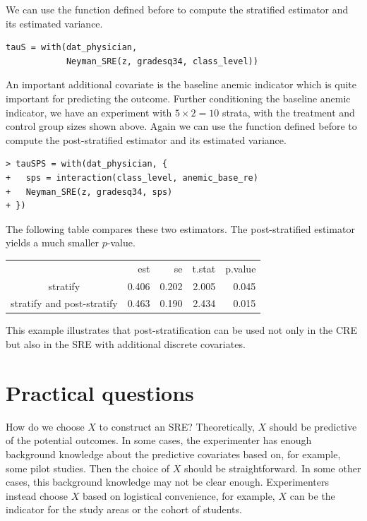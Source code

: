  
We can use the  function defined before to compute the stratified estimator and its estimated variance. 
\begin{lstlisting}
tauS = with(dat_physician,
            Neyman_SRE(z, gradesq34, class_level))
\end{lstlisting}

An important additional covariate is the baseline anemic indicator which is quite important for predicting the outcome. Further conditioning the baseline anemic indicator, we have an experiment with $5\times 2 =10$ strata, with the treatment and control group sizes shown above. 
 Again we can use the  function defined before to compute the post-stratified estimator and its estimated variance. 
 \begin{lstlisting}
> tauSPS = with(dat_physician, {
+   sps = interaction(class_level, anemic_base_re)
+   Neyman_SRE(z, gradesq34, sps)
+ })
\end{lstlisting}

The following table compares these two estimators. The post-stratified estimator yields a much smaller $p$-value. 
\begin{center}
\begin{tabular}{crrrr}
                          & est &   se &t.stat& p.value \\
stratify                & 0.406 &0.202 & 2.005  & 0.045 \\
stratify and post-stratify & 0.463 &0.190 & 2.434 &  0.015
\end{tabular}
\end{center} 

This example illustrates that post-stratification can be used not only in the CRE but also in the SRE with additional discrete covariates. 


\section{Practical questions}


How do we choose $X$ to construct an SRE? Theoretically, $X$ should be predictive of the potential outcomes. In some cases, the experimenter has enough background knowledge about the predictive covariates based on, for example, some pilot studies. 
Then the choice of $X$ should be straightforward. In some other cases, this background knowledge may not be clear enough. Experimenters instead choose $X$ based on logistical convenience, for example, $X$ can be the indicator for the study areas or the cohort of students. 


